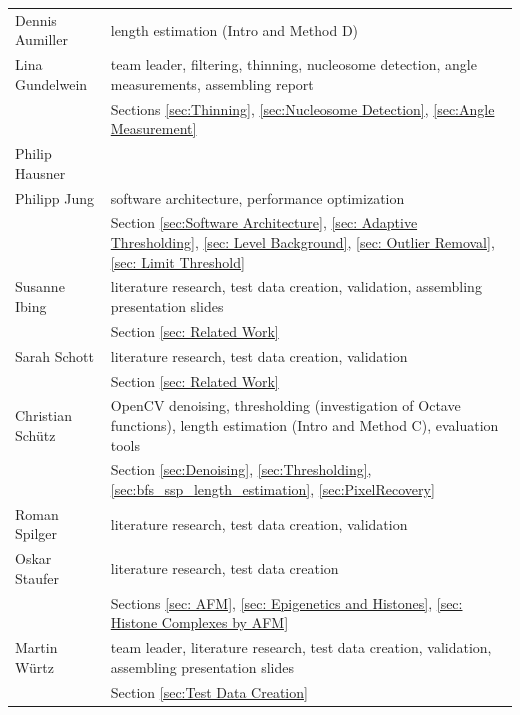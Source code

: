 \documentclass{article}
\begin{document}
\begin{table}[htb]\label{tab: tasks}
\begin{tabular}{p{2.8cm}p{8.3cm}}
Dennis Aumiller & length estimation (Intro and Method D)\\[1em]
Lina Gundelwein & team leader, filtering, thinning, nucleosome detection, angle measurements, assembling report\\
&Sections \ref{sec:Thinning}, \ref{sec:Nucleosome Detection}, \ref{sec:Angle Measurement}\\[1em]
Philip Hausner& \\[1em]
Philipp Jung &  software architecture, performance optimization\\
&Section \ref{sec:Software Architecture}, \ref{sec: Adaptive Thresholding}, \ref{sec: Level Background}, \ref{sec: Outlier Removal}, \ref{sec: Limit Threshold}\\[1em]
Susanne Ibing & literature research, test data creation, validation, assembling presentation slides\\
& Section \ref{sec: Related Work}\\[1em]
Sarah Schott & literature research, test data creation, validation\\
& Section \ref{sec: Related Work}\\[1em]
Christian Schütz& OpenCV denoising, thresholding (investigation of Octave functions), length estimation (Intro and Method C), evaluation tools\\[1em]
& Section \ref{sec:Denoising}, \ref{sec:Thresholding}, \ref{sec:bfs_ssp_length_estimation}, \ref{sec:PixelRecovery}\\[1em]
Roman Spilger& literature research, test data creation, validation\\[1em]
Oskar Staufer & literature research, test data creation \\
& Sections \ref{sec: AFM}, \ref{sec: Epigenetics and Histones}, \ref{sec: Histone Complexes by AFM} \\[1em]
Martin Würtz & team leader, literature research, test data creation, validation, assembling presentation slides\\
&Section \ref{sec:Test Data Creation}\\
\end{tabular}
\end{table}
\end{document}
